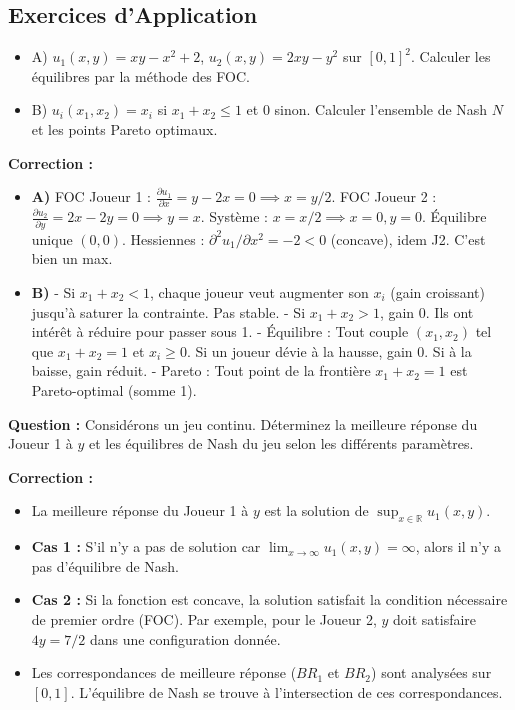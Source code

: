 \subsection{Exercices d'Application}

\begin{exemple}[Exam 2023]
\begin{itemize}
    \item A) $u_1(x,y) = xy - x^2 + 2$, $u_2(x,y) = 2xy - y^2$ sur $[0,1]^2$. Calculer les équilibres par la méthode des FOC.
    \item B) $u_i(x_1, x_2) = x_i$ si $x_1+x_2 \le 1$ et $0$ sinon. Calculer l'ensemble de Nash $N$ et les points Pareto optimaux.
\end{itemize}
\textbf{Correction :}
\begin{itemize}
    \item \textbf{A)} FOC Joueur 1 : $\frac{\partial u_1}{\partial x} = y - 2x = 0 \implies x = y/2$.
    FOC Joueur 2 : $\frac{\partial u_2}{\partial y} = 2x - 2y = 0 \implies y = x$.
    Système : $x = x/2 \implies x=0, y=0$. Équilibre unique $(0,0)$.
    Hessiennes : $\partial^2 u_1 / \partial x^2 = -2 < 0$ (concave), idem J2. C'est bien un max.
    
    \item \textbf{B)} 
    - Si $x_1 + x_2 < 1$, chaque joueur veut augmenter son $x_i$ (gain croissant) jusqu'à saturer la contrainte. Pas stable.
    - Si $x_1 + x_2 > 1$, gain 0. Ils ont intérêt à réduire pour passer sous 1.
    - Équilibre : Tout couple $(x_1, x_2)$ tel que $x_1 + x_2 = 1$ et $x_i \ge 0$. Si un joueur dévie à la hausse, gain 0. Si à la baisse, gain réduit.
    - Pareto : Tout point de la frontière $x_1+x_2=1$ est Pareto-optimal (somme 1).
\end{itemize}
\end{exemple}


\begin{exemple}
\textbf{Question :}
Considérons un jeu continu. Déterminez la meilleure réponse du Joueur 1 à $y$ et les équilibres de Nash du jeu selon les différents paramètres.

\textbf{Correction :}
\begin{itemize}
    \item La meilleure réponse du Joueur 1 à $y$ est la solution de $\sup_{x \in \mathbb{R}} u_1(x, y)$.
    \item \textbf{Cas 1 :} S'il n'y a pas de solution car $\lim_{x \to \infty} u_1(x, y) = \infty$, alors il n'y a pas d'équilibre de Nash.
    \item \textbf{Cas 2 :} Si la fonction est concave, la solution satisfait la condition nécessaire de premier ordre (FOC). Par exemple, pour le Joueur 2, $y$ doit satisfaire $4y = 7/2$ dans une configuration donnée.
    \item Les correspondances de meilleure réponse ($BR_1$ et $BR_2$) sont analysées sur $[0, 1]$. L'équilibre de Nash se trouve à l'intersection de ces correspondances.
\end{itemize}


\end{exemple}

